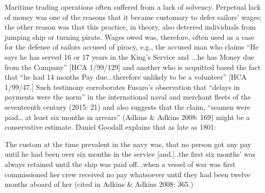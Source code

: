 \begin{styleStandard}
Maritime trading operations often suffered from a lack of solvency. Perpetual lack of money was one of the reasons that it became customary to defer sailors’ wages; the other reason was that this practice, in theory, also deterred individuals from jumping ship or turning pirate. Wages owed was, therefore, often used as a case for the defense of sailors accused of piracy, e.g., the accused man who claims “He says he has served 16 or 17 years in the King’s Service and ...he has Money due from the Company” [HCA 1/99/129] and another who is acquitted based the fact that “he had 14 months Pay due...therefore unlikely to be a volunteer” [HCA 1/99/47.] Such testimony corroborates Fusaro’s observation that “delays in payments were the norm” in the international naval and merchant fleets of the seventeenth century (2015: 21) and also suggests that the claim, “seamen were paid… at least six months in arrears” (Adkins \& Adkins 2008: 169) might be a conservative estimate. Daniel Goodall explains that as late as 1801:
\end{styleStandard}

\begin{styleStandard}
The custom at the time prevalent in the navy was, that no person got any pay until he had been over six months in the service [and.]..the first six months’ was always retained until the ship was paid off...when a vessel of war was first commissioned her crew received no pay whatsoever until they had been twelve months aboard of her (cited in Adkins \& Adkins 2008: 365.)
\end{styleStandard}

